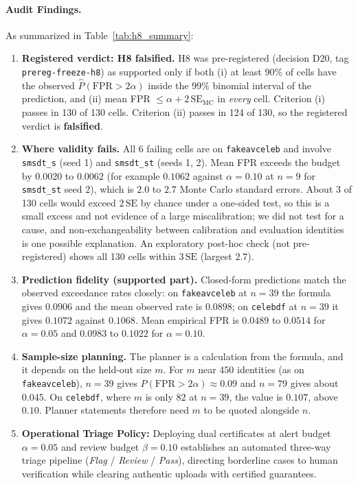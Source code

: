 \paragraph{Audit Findings.}
As summarized in Table~\ref{tab:h8_summary}:
\begin{enumerate}[leftmargin=*]
    \item \textbf{Registered verdict: H8 falsified.} H8 was pre-registered (decision D20, tag \texttt{prereg-freeze-h8}) as supported only if both (i) at least $90\%$ of cells have the observed $\hat{P}(\text{FPR} > 2\alpha)$ inside the $99\%$ binomial interval of the prediction, and (ii) mean FPR $\le \alpha + 2\,\mathrm{SE}_{\mathrm{MC}}$ in \emph{every} cell. Criterion (i) passes in 130 of 130 cells. Criterion (ii) passes in 124 of 130, so the registered verdict is \textbf{falsified}.
    \item \textbf{Where validity fails.} All 6 failing cells are on \texttt{fakeavceleb} and involve \texttt{smsdt\_s} (seed 1) and \texttt{smsdt\_st} (seeds 1, 2). Mean FPR exceeds the budget by $0.0020$ to $0.0062$ (for example $0.1062$ against $\alpha=0.10$ at $n=9$ for \texttt{smsdt\_st} seed 2), which is $2.0$ to $2.7$ Monte Carlo standard errors. About 3 of 130 cells would exceed $2\,\mathrm{SE}$ by chance under a one-sided test, so this is a small excess and not evidence of a large miscalibration; we did not test for a cause, and non-exchangeability between calibration and evaluation identities is one possible explanation. An exploratory post-hoc check (not pre-registered) shows all 130 cells within $3\,\mathrm{SE}$ (largest $2.7$).
    \item \textbf{Prediction fidelity (supported part).} Closed-form predictions match the observed exceedance rates closely: on \texttt{fakeavceleb} at $n=39$ the formula gives $0.0906$ and the mean observed rate is $0.0898$; on \texttt{celebdf} at $n=39$ it gives $0.1072$ against $0.1068$. Mean empirical FPR is $0.0489$ to $0.0514$ for $\alpha=0.05$ and $0.0983$ to $0.1022$ for $\alpha=0.10$.
    \item \textbf{Sample-size planning.} The planner is a calculation from the formula, and it depends on the held-out size $m$. For $m$ near $450$ identities (as on \texttt{fakeavceleb}), $n=39$ gives $P(\text{FPR} > 2\alpha) \approx 0.09$ and $n=79$ gives about $0.045$. On \texttt{celebdf}, where $m$ is only $82$ at $n=39$, the value is $0.107$, above $0.10$. Planner statements therefore need $m$ to be quoted alongside $n$.
    \item \textbf{Operational Triage Policy:} Deploying dual certificates at alert budget $\alpha=0.05$ and review budget $\beta=0.10$ establishes an automated three-way triage pipeline (\emph{Flag} / \emph{Review} / \emph{Pass}), directing borderline cases to human verification while clearing authentic uploads with certified guarantees.
\end{enumerate}

